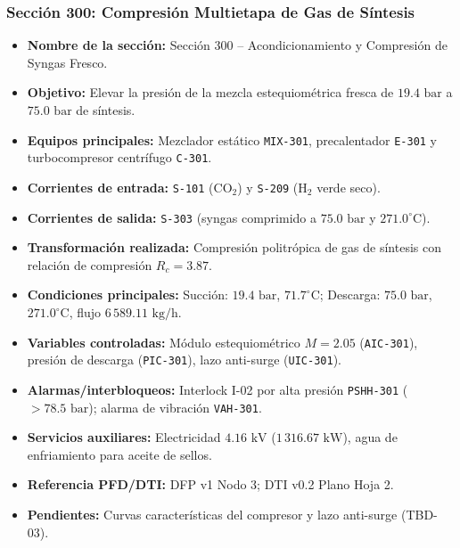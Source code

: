 \documentclass[10pt,letterpaper]{article}
\begin{document}
\subsubsection{Sección 300: Compresión Multietapa de Gas de Síntesis}
\begin{itemize}
    \item \textbf{Nombre de la sección:} Sección 300 -- Acondicionamiento y Compresión de Syngas Fresco.
    \item \textbf{Objetivo:} Elevar la presión de la mezcla estequiométrica fresca de $19.4\text{ bar}$ a $75.0\text{ bar}$ de síntesis.
    \item \textbf{Equipos principales:} Mezclador estático \texttt{MIX-301}, precalentador \texttt{E-301} y turbocompresor centrífugo \texttt{C-301}.
    \item \textbf{Corrientes de entrada:} \texttt{S-101} ($\text{CO}_2$) y \texttt{S-209} ($\text{H}_2$ verde seco).
    \item \textbf{Corrientes de salida:} \texttt{S-303} (syngas comprimido a $75.0\text{ bar}$ y $271.0^\circ\text{C}$).
    \item \textbf{Transformación realizada:} Compresión politrópica de gas de síntesis con relación de compresión $R_c = 3.87$.
    \item \textbf{Condiciones principales:} Succión: $19.4\text{ bar}$, $71.7^\circ\text{C}$; Descarga: $75.0\text{ bar}$, $271.0^\circ\text{C}$, flujo $6\,589.11\text{ kg/h}$.
    \item \textbf{Variables controladas:} Módulo estequiométrico $M = 2.05$ (\texttt{AIC-301}), presión de descarga (\texttt{PIC-301}), lazo anti-surge (\texttt{UIC-301}).
    \item \textbf{Alarmas/interbloqueos:} Interlock I-02 por alta presión \texttt{PSHH-301} ($>78.5\text{ bar}$); alarma de vibración \texttt{VAH-301}.
    \item \textbf{Servicios auxiliares:} Electricidad $4.16\text{ kV}$ ($1\,316.67\text{ kW}$), agua de enfriamiento para aceite de sellos.
    \item \textbf{Referencia PFD/DTI:} DFP v1 Nodo 3; DTI v0.2 Plano Hoja 2.
    \item \textbf{Pendientes:} Curvas características del compresor y lazo anti-surge (TBD-03).
\end{itemize}
\end{document}
